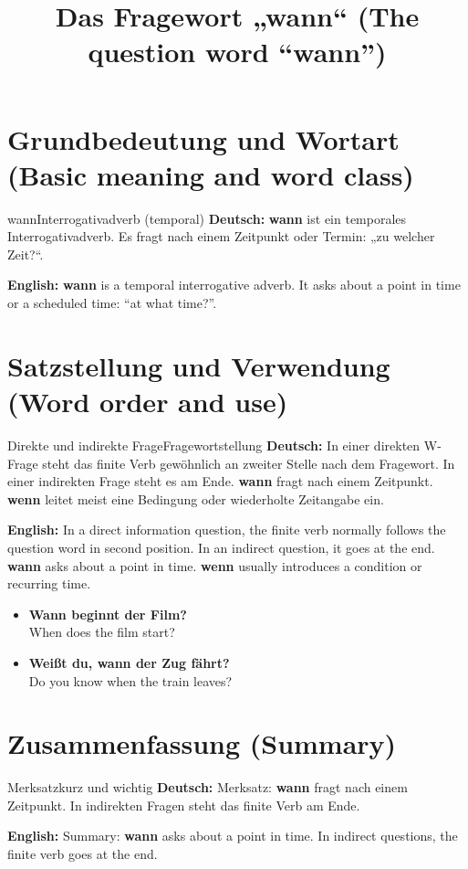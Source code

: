 \documentclass[a4paper,11pt]{article}
\title{Das Fragewort „wann“ (The question word “wann”)}
\date{}
\newcommand{\GermanText}[1]{\textbf{Deutsch: }#1\par}
\newcommand{\EnglishText}[1]{{\small\color{SoftGray}\textbf{English: }#1\par}}
\newcommand{\ExampleItem}[2]{\item \textbf{#1}\\{\small\color{SoftGray}#2}}
\begin{document}
\maketitle
\tableofcontents
\newpage
\section{Grundbedeutung und Wortart (Basic meaning and word class)}
\begin{grammarentry}{wann}{Interrogativadverb (temporal)}
\GermanText{\textbf{wann} ist ein temporales Interrogativadverb. Es fragt nach einem Zeitpunkt oder Termin: „zu welcher Zeit?“.}
\EnglishText{\textbf{wann} is a temporal interrogative adverb. It asks about a point in time or a scheduled time: “at what time?”.}

\end{grammarentry}
\section{Satzstellung und Verwendung (Word order and use)}
\begin{grammarentry}{Direkte und indirekte Frage}{Fragewortstellung}
\GermanText{In einer direkten W-Frage steht das finite Verb gewöhnlich an zweiter Stelle nach dem Fragewort. In einer indirekten Frage steht es am Ende. \textbf{wann} fragt nach einem Zeitpunkt. \textbf{wenn} leitet meist eine Bedingung oder wiederholte Zeitangabe ein.}
\EnglishText{In a direct information question, the finite verb normally follows the question word in second position. In an indirect question, it goes at the end. \textbf{wann} asks about a point in time. \textbf{wenn} usually introduces a condition or recurring time.}
\end{grammarentry}
\begin{exbox}\begin{itemize}
\ExampleItem{Wann beginnt der Film?}{When does the film start?}
\ExampleItem{Weißt du, wann der Zug fährt?}{Do you know when the train leaves?}
\end{itemize}\end{exbox}
\section{Zusammenfassung (Summary)}
\begin{grammarentry}{Merksatz}{kurz und wichtig}
\GermanText{Merksatz: \textbf{wann} fragt nach einem Zeitpunkt. In indirekten Fragen steht das finite Verb am Ende.}
\EnglishText{Summary: \textbf{wann} asks about a point in time. In indirect questions, the finite verb goes at the end.}
\end{grammarentry}
\end{document}
